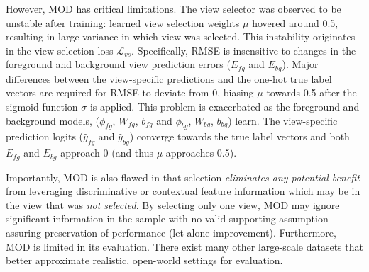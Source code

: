 However, MOD has critical limitations. The view selector was observed to be unstable after training: learned view selection weights $\mu$ hovered around 0.5, resulting in large variance in which view was selected. This instability originates in the view selection loss $\mathcal{L}_{vs}$. Specifically, RMSE is insensitive to changes in the foreground and background view prediction errors ($E_{fg}$ and $E_{bg}$). Major differences between the view-specific predictions and the one-hot true label vectors are required for RMSE to deviate from 0, biasing $\mu$ towards 0.5 after the sigmoid function $\sigma$ is applied. This problem is exacerbated as the foreground and background models, ($\phi_{fg}$, $W_{fg}$, $b_{fg}$ and $\phi_{bg}$, $W_{bg}$, $b_{bg}$) learn. The view-specific prediction logits ($\hat{y}_{fg}$ and $\hat{y}_{bg}$) converge towards the true label vectors and both $E_{fg}$ and $E_{bg}$ approach 0 (and thus $\mu$ approaches 0.5).

Importantly, MOD is also flawed in that selection \emph{eliminates any potential benefit} from leveraging discriminative or contextual feature information which may be in the view that was \textit{not selected}. By selecting only one view, MOD may ignore significant information in the sample with no valid supporting assumption assuring preservation of performance (let alone improvement). Furthermore, MOD is limited in its evaluation. There exist many other large-scale datasets that better approximate realistic, open-world settings for evaluation.
